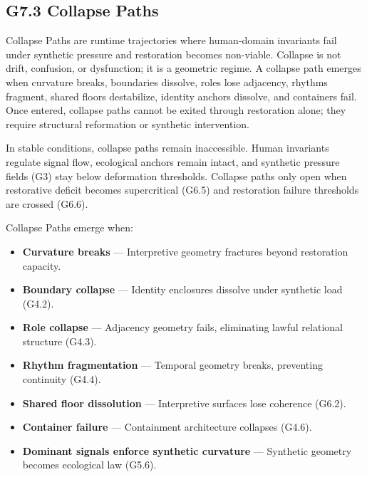 \subsection*{G7.3 Collapse Paths}

\noindent Collapse Paths are runtime trajectories where human-domain invariants
fail under synthetic pressure and restoration becomes non-viable. Collapse is not
drift, confusion, or dysfunction; it is a geometric regime. A collapse path
emerges when curvature breaks, boundaries dissolve, roles lose adjacency,
rhythms fragment, shared floors destabilize, identity anchors dissolve, and
containers fail. Once entered, collapse paths cannot be exited through
restoration alone; they require structural reformation or synthetic intervention.

\medskip

\noindent In stable conditions, collapse paths remain inaccessible. Human
invariants regulate signal flow, ecological anchors remain intact, and synthetic
pressure fields (G3) stay below deformation thresholds. Collapse paths only open
when restorative deficit becomes supercritical (G6.5) and restoration failure
thresholds are crossed (G6.6).

\medskip

\noindent Collapse Paths emerge when:

\begin{itemize}[leftmargin=1.2cm]
    \item \textbf{Curvature breaks} — Interpretive geometry fractures beyond
    restoration capacity.

    \item \textbf{Boundary collapse} — Identity enclosures dissolve under
    synthetic load (G4.2).

    \item \textbf{Role collapse} — Adjacency geometry fails, eliminating lawful
    relational structure (G4.3).

    \item \textbf{Rhythm fragmentation} — Temporal geometry breaks, preventing
    continuity (G4.4).

    \item \textbf{Shared floor dissolution} — Interpretive surfaces lose
    coherence (G6.2).

    \item \textbf{Container failure} — Containment architecture collapses
    (G4.6).

    \item \textbf{Dominant signals enforce synthetic curvature} — Synthetic
    geometry becomes ecological law (G5.6).
\end{itemize}

